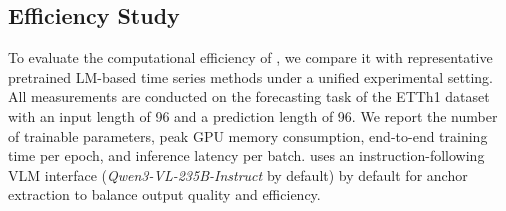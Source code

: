 
\subsection{Efficiency Study}
\label{sec:efficiency}

To evaluate the computational efficiency of \model, we compare it with representative pretrained LM-based time series methods under a unified experimental setting. All measurements are conducted on the forecasting task of the ETTh1 dataset with an input length of 96 and a prediction length of 96. We report the number of trainable parameters, peak GPU memory consumption, end-to-end training time per epoch, and inference latency per batch. \model uses an instruction-following VLM interface (\textit{Qwen3-VL-235B-Instruct} by default) by default for anchor extraction to balance output quality and efficiency. %

%
\begin{table}[tbp]
\caption{Efficiency comparison between MAS4TS and pretrained LM-based time-series baselines on ETTh1 forecasting ($L{=}96$, $H{=}96$). We report trainable parameters, peak GPU memory, training time per epoch, and inference latency per batch. MAS4TS variants use \textit{Qwen3-VL-235B-Thinking} (Thinking) and \textit{Nano-Banana} (Generative), and the baselines use GPT-2 as the text encoding.}
  \label{tab:all_efficiency}
  \vskip 0.05in
  \centering
  \vspace{-4mm}
\end{table}


